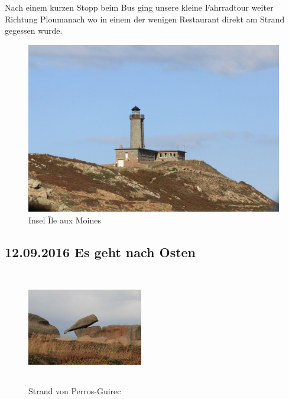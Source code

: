 Nach einem kurzen Stopp beim Bus ging unsere kleine Fahrradtour weiter Richtung Ploumanach wo in einem der wenigen Restaurant direkt am Strand gegessen wurde.

\begin{figure}[H]
    \centering
    \includegraphics[width=\textwidth]{../Bilder/Bretagne/89.jpg}
    \caption{Insel Île aux Moines}
    \label{img:Insel Île aux Moines}
\end{figure}

\subsection{12.09.2016 Es geht nach Osten}

\begin{figure} 
  \begin{centering}
    \includegraphics[width=0.45\textwidth, height=5cm, keepaspectratio]{../Bilder/Bretagne/95.jpg}
    \caption{Strand von Perros-Guirec}
  \end{centering}
\end{figure} 

